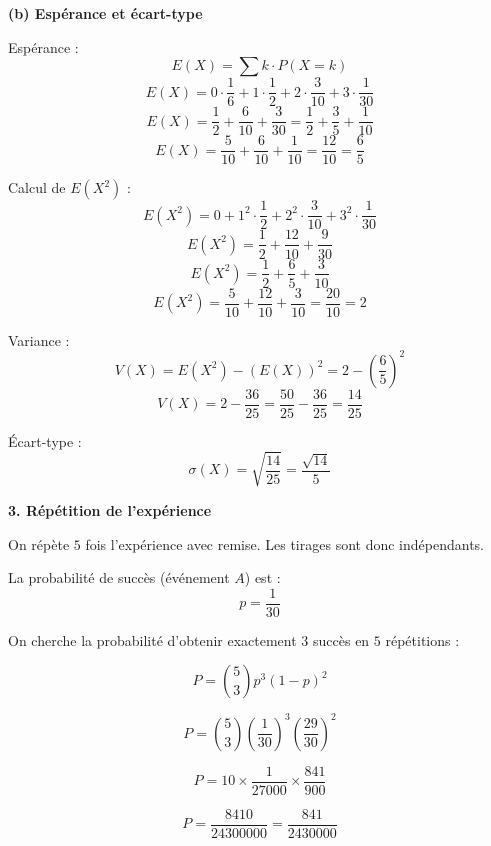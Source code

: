 \documentclass[12pt,a4paper]{article}
\begin{document}
\begin{correction}
\textbf{(b) Espérance et écart-type}

\medskip

Espérance :
\[
E(X) = \sum k \cdot P(X=k)
\]
\[
E(X) = 0 \cdot \frac{1}{6} + 1 \cdot \frac{1}{2} + 2 \cdot \frac{3}{10} + 3 \cdot \frac{1}{30}
\]
\[
E(X) = \frac{1}{2} + \frac{6}{10} + \frac{3}{30} = \frac{1}{2} + \frac{3}{5} + \frac{1}{10}
\]
\[
E(X) = \frac{5}{10} + \frac{6}{10} + \frac{1}{10} = \frac{12}{10} = \frac{6}{5}
\]

\medskip

Calcul de $E(X^2)$ :
\[
E(X^2) = 0 + 1^2 \cdot \frac{1}{2} + 2^2 \cdot \frac{3}{10} + 3^2 \cdot \frac{1}{30}
\]
\[
E(X^2) = \frac{1}{2} + \frac{12}{10} + \frac{9}{30}
\]
\[
E(X^2) = \frac{1}{2} + \frac{6}{5} + \frac{3}{10}
\]
\[
E(X^2) = \frac{5}{10} + \frac{12}{10} + \frac{3}{10} = \frac{20}{10} = 2
\]

\medskip

Variance :
\[
V(X) = E(X^2) - (E(X))^2 = 2 - \left(\frac{6}{5}\right)^2
\]
\[
V(X) = 2 - \frac{36}{25} = \frac{50}{25} - \frac{36}{25} = \frac{14}{25}
\]

\medskip

Écart-type :
\[
\sigma(X) = \sqrt{\frac{14}{25}} = \frac{\sqrt{14}}{5}
\]

\bigskip

\textbf{3. Répétition de l'expérience}

On répète $5$ fois l'expérience avec remise. Les tirages sont donc indépendants.

La probabilité de succès (événement $A$) est :
\[
p = \frac{1}{30}
\]

On cherche la probabilité d'obtenir exactement $3$ succès en $5$ répétitions :

\[
P = \binom{5}{3} p^3 (1-p)^2
\]

\[
P = \binom{5}{3} \left(\frac{1}{30}\right)^3 \left(\frac{29}{30}\right)^2
\]

\[
P = 10 \times \frac{1}{27000} \times \frac{841}{900}
\]

\[
P = \frac{8410}{24300000} = \frac{841}{2430000}
\]

\end{correction}
\end{document}

